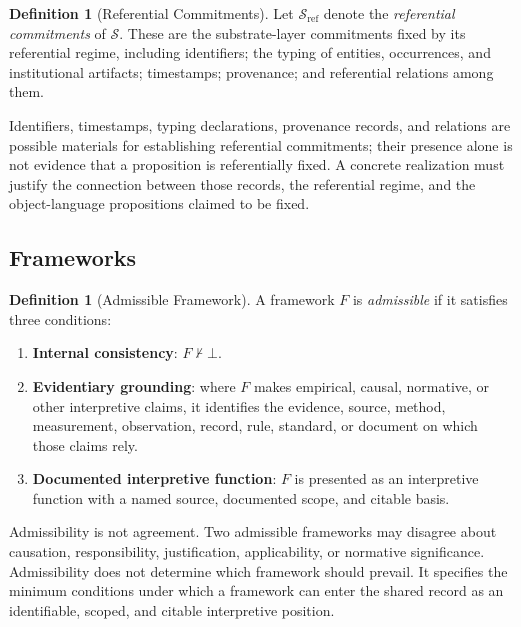 \documentclass[11pt]{article}
\theoremstyle{plain}
\theoremstyle{definition}
\newtheorem{definition}[theorem]{Definition}
\theoremstyle{remark}
\newcommand{\Substrate}{\mathcal{S}}
\newcommand{\SubstrateRef}{\mathcal{S}_{\mathrm{ref}}}
\newcommand{\Framework}{F}
\newcommand{\notentails}{\nvdash}
\begin{document}
\begin{definition}[Referential Commitments]
  \label{se100.def.ReferentialCommitments}
  Let $\SubstrateRef$ denote the \emph{referential commitments} of $\Substrate$.
  These are the substrate-layer commitments fixed by its referential regime,
  including identifiers;
  the typing of entities, occurrences, and institutional artifacts;
  timestamps;
  provenance;
  and referential relations among them.
\end{definition}

Identifiers, timestamps, typing declarations, provenance records, and
relations are possible materials for establishing referential commitments;
their presence alone is not evidence that a proposition is referentially fixed.
A concrete realization must justify the connection between those records,
the referential regime, and the object-language propositions claimed to be fixed.

\subsection*{Frameworks}

\begin{definition}[Admissible Framework]
  \label{se100.def.AdmissibleFramework}
  A framework $\Framework$ is \emph{admissible} if it satisfies three conditions:
  \begin{enumerate}
    \item \textbf{Internal consistency}: $\Framework \notentails \bot$.
    \item \textbf{Evidentiary grounding}: where $\Framework$ makes empirical,
          causal, normative, or other interpretive claims, it identifies the evidence,
          source, method, measurement, observation, record, rule, standard, or
          document on which those claims rely.
    \item \textbf{Documented interpretive function}: $\Framework$ is presented as
          an interpretive function with a
          named source, documented scope, and citable basis.
  \end{enumerate}
\end{definition}

Admissibility is not agreement.
Two admissible frameworks may disagree about
causation, responsibility, justification, applicability, or normative significance.
Admissibility does not determine which framework should prevail.
It specifies the minimum conditions under which a framework can enter
the shared record as an identifiable, scoped, and citable interpretive position.
\end{document}
